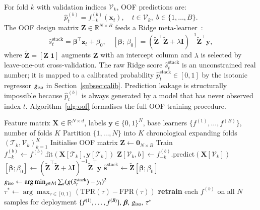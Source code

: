 For fold $k$ with validation indices $\mathcal{V}_k$, OOF predictions are:
\begin{equation}
\hat{p}_t^{(b)} = f_{-k}^{(b)}(\mathbf{x}_t),\quad t \in \mathcal{V}_k,\;
b \in \{1,\ldots,B\}.
\label{eq:oof}
\end{equation}
The OOF design matrix $\mathbf{Z} \in \mathbb{R}^{N\times B}$ feeds a Ridge
meta-learner~\cite{wolpert1992stacked}:
\begin{equation}
\hat{s}_t^{\text{stack}} = \boldsymbol{\beta}^{\!\top}\mathbf{z}_t + \beta_0,\quad
[\boldsymbol{\beta};\,\beta_0] =
(\tilde{\mathbf{Z}}^{\!\top}\tilde{\mathbf{Z}}+\lambda\mathbf{I})^{-1}\tilde{\mathbf{Z}}^{\!\top}\mathbf{y},
\label{eq:stack}
\end{equation}
where $\tilde{\mathbf{Z}}=[\mathbf{Z}\;\mathbf{1}]$ augments $\mathbf{Z}$ with an
intercept column and $\lambda$ is selected by leave-one-out cross-validation.
The raw Ridge score $\hat{s}_t^{\text{stack}}$ is an unconstrained real number;
it is mapped to a calibrated probability $\hat{p}_t^{\text{stack}}\in[0,1]$ by
the isotonic regressor $g_{\rm iso}$ in Section~\ref{subsec:calib}.
Prediction leakage is structurally impossible because $\hat{p}_t^{(b)}$ is always
generated by a model that has never observed index $t$.
Algorithm~\ref{alg:oof} formalises the full OOF training procedure.

\begin{algorithm}[t]
\caption{OOF Ensemble Training with Ridge Stacking and Isotonic Calibration}
\label{alg:oof}
\begin{algorithmic}[1]
\Require Feature matrix $\mathbf{X}\!\in\!\mathbb{R}^{N\times d}$, labels
         $\mathbf{y}\!\in\!\{0,1\}^{N}$, base learners
         $\{f^{(1)},\ldots,f^{(B)}\}$, number of folds $K$
\State Partition $\{1,\ldots,N\}$ into $K$ chronological expanding folds
       $(\mathcal{T}_k,\mathcal{V}_k)_{k=1}^K$
\State Initialise OOF matrix $\mathbf{Z}\gets\mathbf{0}_{N\times B}$
    \State Train $f^{(b)}_{-k}\gets f^{(b)}.\text{fit}(\mathbf{X}[\mathcal{T}_k],\mathbf{y}[\mathcal{T}_k])$
    \State $\mathbf{Z}[\mathcal{V}_k, b]\gets f^{(b)}_{-k}.\text{predict}(\mathbf{X}[\mathcal{V}_k])$
  \EndFor
\EndFor
\State $[\boldsymbol{\beta};\beta_0]\gets(\tilde{\mathbf{Z}}^{\!\top}\tilde{\mathbf{Z}}+\lambda\mathbf{I})^{-1}\tilde{\mathbf{Z}}^{\!\top}\mathbf{y}$
\State $\hat{\mathbf{s}}^{\text{stack}}\gets\tilde{\mathbf{Z}}[\boldsymbol{\beta};\beta_0]$
\State $g_{\rm iso}\gets\arg\min_{g\in\mathcal{M}}\sum_{t}(g(\hat{s}_t^{\text{stack}})-y_t)^2$
\State $\tau^{*}\gets\arg\max_{\tau\in[0,1]}(\mathrm{TPR}(\tau)-\mathrm{FPR}(\tau))$
\State \textbf{retrain} each $f^{(b)}$ on all $N$ samples for deployment
\State \Return $\{f^{(1)},\ldots,f^{(B)}\},\,\boldsymbol{\beta},\,g_{\rm iso},\,\tau^{*}$
\end{algorithmic}
\end{algorithm}

